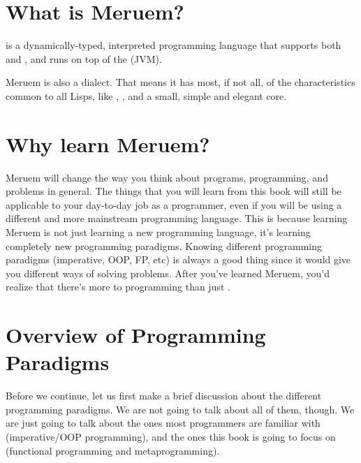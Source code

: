 \section{What is Meruem?}
 is a dynamically-typed, interpreted programming language that supports both  and , and runs on top of the (JVM).

Meruem is also a  dialect. That means it has most, if not all, of the characteristics common to all Lisps, like , , and a small, simple and elegant core.

\section{Why learn Meruem?}
Meruem will change the way you think about programs, programming, and problems in general. The things that you will learn from this book will still be applicable to your day-to-day job as a programmer, even if you will be using a different and more mainstream programming language. This is because learning Meruem is not just learning a new programming language, it's learning completely new programming paradigms. Knowing different programming paradigms (imperative, OOP, FP, etc) is always a good thing since it would give you different ways of solving problems. After you've learned Meruem, you'd realize that there's more to programming than just .

\section{Overview of Programming Paradigms}
Before we continue, let us first make a brief discussion about the different programming paradigms. We are not going to talk about all of them, though. We are just going to talk about the ones most programmers are familiar with (imperative/OOP programming), and the ones this book is going to focus on (functional programming and metaprogramming).

